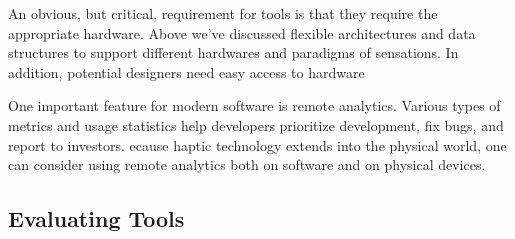 An obvious, but critical, requirement for \haxd tools is that they require the appropriate hardware.
Above we've discussed flexible architectures and data structures to support different hardwares and paradigms of sensations.
In addition, potential designers need easy access to hardware


One important feature for modern software is remote analytics.
Various types of metrics and usage statistics help developers prioritize development, fix bugs, and report to investors.
ecause haptic technology extends into the physical world, one can consider using remote analytics both on software and on physical devices.



%
%
\subsection{Evaluating \haxd Tools}




